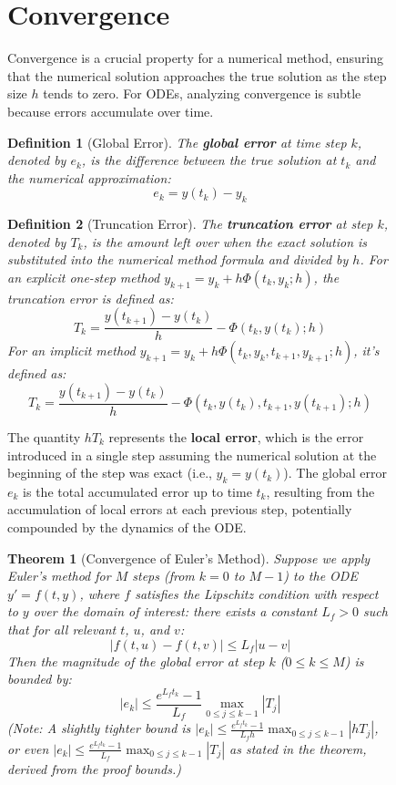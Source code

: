 \documentclass{article}
\newtheorem{theorem}{Theorem}
\newtheorem{definition}{Definition}
\newtheorem{theorem}{Theorem}
\newtheorem{definition}{Definition}
\begin{document}
\begin{figure}[h]
\section{Convergence}
Convergence is a crucial property for a numerical method, ensuring that the numerical solution approaches the true solution as the step size $h$ tends to zero. For ODEs, analyzing convergence is subtle because errors accumulate over time.
\begin{definition}[Global Error]
The \textbf{global error} at time step $k$, denoted by $e_k$, is the difference between the true solution at $t_k$ and the numerical approximation:
\[ e_k = y(t_k) - y_k \]
\end{definition}
\begin{definition}[Truncation Error]
The \textbf{truncation error} at step $k$, denoted by $T_k$, is the amount left over when the exact solution is substituted into the numerical method formula and divided by $h$. For an explicit one-step method $y_{k+1} = y_k + h \Phi(t_k, y_k; h)$, the truncation error is defined as:
\[ T_k = \frac{y(t_{k+1}) - y(t_k)}{h} - \Phi(t_k, y(t_k); h) \]
For an implicit method $y_{k+1} = y_k + h \Phi(t_k, y_k, t_{k+1}, y_{k+1}; h)$, it's defined as:
\[ T_k = \frac{y(t_{k+1}) - y(t_k)}{h} - \Phi(t_k, y(t_k), t_{k+1}, y(t_{k+1}); h) \]
\end{definition}
The quantity $h T_k$ represents the \textbf{local error}, which is the error introduced in a single step assuming the numerical solution at the beginning of the step was exact (i.e., $y_k = y(t_k)$). The global error $e_k$ is the total accumulated error up to time $t_k$, resulting from the accumulation of local errors at each previous step, potentially compounded by the dynamics of the ODE.
\begin{theorem}[Convergence of Euler's Method]
Suppose we apply Euler's method for $M$ steps (from $k=0$ to $M-1$) to the ODE $y' = f(t,y)$, where $f$ satisfies the Lipschitz condition with respect to $y$ over the domain of interest: there exists a constant $L_f > 0$ such that for all relevant $t$, $u$, and $v$:
\[ |f(t, u) - f(t, v)| \le L_f |u - v| \]
Then the magnitude of the global error at step $k$ ($0 \le k \le M$) is bounded by:
\[ |e_k| \le \frac{e^{L_f t_k} - 1}{L_f} \max_{0 \le j \le k-1} |T_j| \]
(Note: A slightly tighter bound is $|e_k| \le \frac{e^{L_f t_k} - 1}{L_f h} \max_{0 \le j \le k-1} |h T_j|$, or even $|e_k| \le \frac{e^{L_f t_k} - 1}{L_f} \max_{0 \le j \le k-1} |T_j|$ as stated in the theorem, derived from the proof bounds.)
\end{theorem}

\end{figure}
\end{document}
